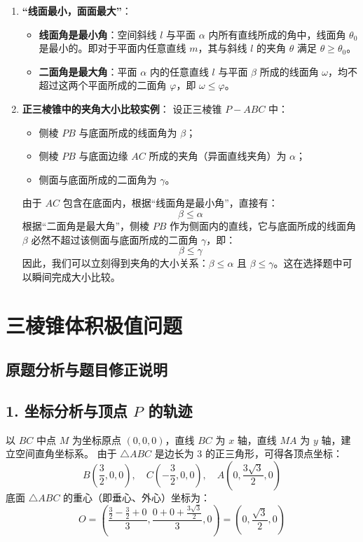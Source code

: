 \documentclass[11pt,a4paper]{ctexart}
\begin{document}
\begin{enumerate}
    \item \textbf{“线面最小，面面最大”}：
    \begin{itemize}
        \item \textbf{线面角是最小角}：空间斜线 $l$ 与平面 $\alpha$ 内所有直线所成的角中，线面角 $\theta_0$ 是最小的。即对于平面内任意直线 $m$，其与斜线 $l$ 的夹角 $\theta$ 满足 $\theta \ge \theta_0$。
        \item \textbf{二面角是最大角}：平面 $\alpha$ 内的任意直线 $l$ 与平面 $\beta$ 所成的线面角 $\omega$，均不超过这两个平面所成的二面角 $\varphi$，即 $\omega \le \varphi$。
    \end{itemize}
    \item \textbf{正三棱锥中的夹角大小比较实例}：
    设正三棱锥 $P-ABC$ 中：
    \begin{itemize}
        \item 侧棱 $PB$ 与底面所成的线面角为 $\beta$；
        \item 侧棱 $PB$ 与底面边缘 $AC$ 所成的夹角（异面直线夹角）为 $\alpha$；
        \item 侧面与底面所成的二面角为 $\gamma$。
    \end{itemize}
    由于 $AC$ 包含在底面内，根据“线面角是最小角”，直接有：
    \[ \beta \le \alpha \]
    根据“二面角是最大角”，侧棱 $PB$ 作为侧面内的直线，它与底面所成的线面角 $\beta$ 必然不超过该侧面与底面所成的二面角 $\gamma$，即：
    \[ \beta \le \gamma \]
    因此，我们可以立刻得到夹角的大小关系：$\beta \le \alpha$ 且 $\beta \le \gamma$。这在选择题中可以瞬间完成大小比较。
\end{enumerate}

\newpage
\section{三棱锥体积极值问题}

\subsection{原题分析与题目修正说明}

\subsection*{1. 坐标分析与顶点 $P$ 的轨迹}
以 $BC$ 中点 $M$ 为坐标原点 $(0,0,0)$，直线 $BC$ 为 $x$ 轴，直线 $MA$ 为 $y$ 轴，建立空间直角坐标系。
由于 $\triangle ABC$ 是边长为 3 的正三角形，可得各顶点坐标：
$$B\left(\frac{3}{2}, 0, 0\right), \quad C\left(-\frac{3}{2}, 0, 0\right), \quad A\left(0, \frac{3\sqrt{3}}{2}, 0\right)$$
底面 $\triangle ABC$ 的重心（即垂心、外心）坐标为：
$$O = \left( \frac{\frac{3}{2} - \frac{3}{2} + 0}{3}, \frac{0 + 0 + \frac{3\sqrt{3}}{2}}{3}, 0 \right) = \left(0, \frac{\sqrt{3}}{2}, 0\right)$$
\end{document}
